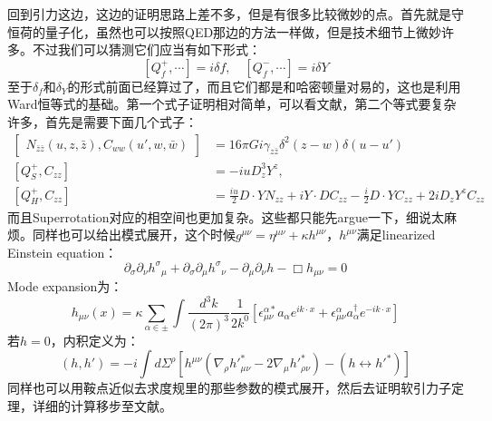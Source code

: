 回到引力这边，这边的证明思路上差不多，但是有很多比较微妙的点。首先就是守恒荷的量子化，虽然也可以按照QED那边的方法一样做，但是技术细节上微妙许多。不过我们可以猜测它们应当有如下形式：
\begin{equation}
	\boxed{
		\left[Q_f^+,\cdots\right]=i\delta f,\quad \left[Q_f^-,\cdots\right]=i\delta Y
	}
\end{equation}
至于$\delta_f$和$\delta_Y$的形式前面已经算过了，而且它们都是和哈密顿量对易的，这也是利用Ward恒等式的基础。第一个式子证明相对简单，可以看文献\cite{He:2014laa}，第二个等式要复杂许多，首先是需要下面几个式子\cite{Ashtekar1987AsymptoticQ,Ashtekar:1978zz,Ashtekar:1981bq,PhysRevLett.46.573}：
\begin{equation}
	\begin{aligned}
		\begin{bmatrix}N_{\bar{z}\bar{z}}(u,z,\bar{z}),C_{ww}(u',w,\bar{w})\end{bmatrix}&=16\pi Gi\gamma_{z\bar{z}}\delta^2(z-w)\delta(u-u')\\
		\left[Q_{S}^{+},C_{zz}\right]&=-iuD_{z}^{3}Y^{z},\\\left[Q_{H}^{+},C_{zz}\right]&=\frac{iu}{2}D\cdot YN_{zz}+iY\cdot DC_{zz}-\frac{i}{2}D\cdot YC_{zz}+2iD_{z}Y^{z}C_{zz}
	\end{aligned}
\end{equation}
而且Superrotation对应的相空间也更加复杂\cite{Strominger:2016wns}。这些都只能先argue一下，细说太麻烦。同样也可以给出模式展开，这个时候$g^{\mu\nu}=\eta^{\mu\nu}+\kappa h^{\mu\nu}$，$h^{\mu\nu}$满足linearized Einstein equation：
\begin{equation}
	\partial_{\sigma}\partial_{\nu}h^{\sigma}{}_{\mu}+\partial_{\sigma}\partial_{\mu}h^{\sigma}{}_{\nu}-\partial_{\mu}\partial_{\nu}h-\Box h_{\mu\nu}=0
\end{equation}
Mode expansion为：
\begin{equation}
	{h}_{\mu\nu}(x)=\kappa\sum_{\alpha\in\pm}\int\frac{d^3k}{(2\pi)^3}\frac{1}{2k^0}\left[\epsilon_{\mu\nu}^{\alpha*}a_{\alpha}e^{ik\cdot x}+\epsilon_{\mu\nu}^{\alpha}a_{\alpha}^{\dagger}e^{-ik\cdot x}\right]
\end{equation}
若$h=0$，内积定义为：
\begin{equation}
	(h,h')=-i\int d\Sigma^\rho[h^{\mu\nu}(\nabla_\rho {h'}_{\mu\nu}^*-2\nabla_\mu {h'}_{\rho\nu}^*)-(h\leftrightarrow {h'}^*)]
\end{equation}
同样也可以用鞍点近似去求度规里的那些参数的模式展开，然后去证明软引力子定理，详细的计算移步至文献\cite{Kapec:2014opa,He:2014laa}。


